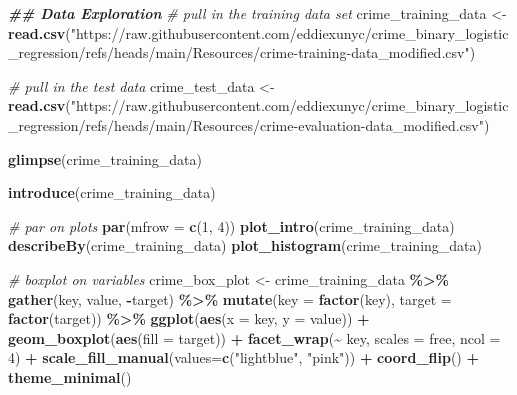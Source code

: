 \documentclass[
]{article}
\newenvironment{Shaded}{\begin{snugshade}}{\end{snugshade}}
\newcommand{\AttributeTok}[1]{\textcolor[rgb]{0.13,0.29,0.53}{#1}}
\newcommand{\CommentTok}[1]{\textcolor[rgb]{0.56,0.35,0.01}{\textit{#1}}}
\newcommand{\DecValTok}[1]{\textcolor[rgb]{0.00,0.00,0.81}{#1}}
\newcommand{\DocumentationTok}[1]{\textcolor[rgb]{0.56,0.35,0.01}{\textbf{\textit{#1}}}}
\newcommand{\FunctionTok}[1]{\textcolor[rgb]{0.13,0.29,0.53}{\textbf{#1}}}
\newcommand{\NormalTok}[1]{#1}
\newcommand{\OtherTok}[1]{\textcolor[rgb]{0.56,0.35,0.01}{#1}}
\newcommand{\SpecialCharTok}[1]{\textcolor[rgb]{0.81,0.36,0.00}{\textbf{#1}}}
\newcommand{\StringTok}[1]{\textcolor[rgb]{0.31,0.60,0.02}{#1}}
\begin{document}
\begin{Shaded}
\begin{Highlighting}[]
\DocumentationTok{\#\#  Data Exploration}
\CommentTok{\# pull in the training data set}
\NormalTok{crime\_training\_data }\OtherTok{\textless{}{-}} \FunctionTok{read.csv}\NormalTok{(}\StringTok{"https://raw.githubusercontent.com/eddiexunyc/crime\_binary\_logistic\_regression/refs/heads/main/Resources/crime{-}training{-}data\_modified.csv"}\NormalTok{)}

\CommentTok{\# pull in the test data}
\NormalTok{crime\_test\_data }\OtherTok{\textless{}{-}} \FunctionTok{read.csv}\NormalTok{(}\StringTok{"https://raw.githubusercontent.com/eddiexunyc/crime\_binary\_logistic\_regression/refs/heads/main/Resources/crime{-}evaluation{-}data\_modified.csv"}\NormalTok{)}

\FunctionTok{glimpse}\NormalTok{(crime\_training\_data)}

\FunctionTok{introduce}\NormalTok{(crime\_training\_data)}

\CommentTok{\# par on plots}
\FunctionTok{par}\NormalTok{(}\AttributeTok{mfrow =} \FunctionTok{c}\NormalTok{(}\DecValTok{1}\NormalTok{, }\DecValTok{4}\NormalTok{))}
\FunctionTok{plot\_intro}\NormalTok{(crime\_training\_data)}
\FunctionTok{describeBy}\NormalTok{(crime\_training\_data)}
\FunctionTok{plot\_histogram}\NormalTok{(crime\_training\_data)}

\CommentTok{\# boxplot on variables}
\NormalTok{crime\_box\_plot }\OtherTok{\textless{}{-}}\NormalTok{ crime\_training\_data }\SpecialCharTok{\%\textgreater{}\%}
  \FunctionTok{gather}\NormalTok{(key, value, }\SpecialCharTok{{-}}\NormalTok{target) }\SpecialCharTok{\%\textgreater{}\%} 
  \FunctionTok{mutate}\NormalTok{(}\AttributeTok{key =} \FunctionTok{factor}\NormalTok{(key),}
         \AttributeTok{target =} \FunctionTok{factor}\NormalTok{(target)) }\SpecialCharTok{\%\textgreater{}\%} 
  \FunctionTok{ggplot}\NormalTok{(}\FunctionTok{aes}\NormalTok{(}\AttributeTok{x =}\NormalTok{ key, }\AttributeTok{y =}\NormalTok{ value)) }\SpecialCharTok{+}
  \FunctionTok{geom\_boxplot}\NormalTok{(}\FunctionTok{aes}\NormalTok{(}\AttributeTok{fill =}\NormalTok{ target)) }\SpecialCharTok{+}
  \FunctionTok{facet\_wrap}\NormalTok{(}\SpecialCharTok{\textasciitilde{}}\NormalTok{ key, }\AttributeTok{scales =} \StringTok{\textquotesingle{}free\textquotesingle{}}\NormalTok{, }\AttributeTok{ncol =} \DecValTok{4}\NormalTok{) }\SpecialCharTok{+}
  \FunctionTok{scale\_fill\_manual}\NormalTok{(}\AttributeTok{values=}\FunctionTok{c}\NormalTok{(}\StringTok{"lightblue"}\NormalTok{, }\StringTok{"pink"}\NormalTok{)) }\SpecialCharTok{+}
  \FunctionTok{coord\_flip}\NormalTok{() }\SpecialCharTok{+}
  \FunctionTok{theme\_minimal}\NormalTok{()}


\end{Highlighting}
\end{Shaded}
\end{document}
